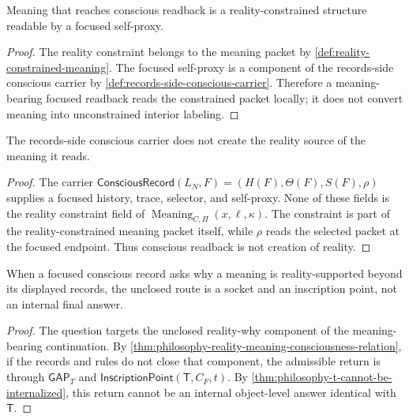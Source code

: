 \begin{corollary}
\label{cor:philosophy-meaning-readable-reality-constraint}
Meaning that reaches conscious readback is a reality-constrained
structure readable by a focused self-proxy.
\end{corollary}
\begin{proof}
The reality constraint belongs to the meaning packet by
\autoref{def:reality-constrained-meaning}. The focused self-proxy is a
component of the records-side conscious carrier by
\autoref{def:records-side-conscious-carrier}. Therefore a
meaning-bearing focused readback reads the constrained packet locally; it
does not convert meaning into unconstrained interior labeling.
\end{proof}

\begin{corollary}
\label{cor:philosophy-consciousness-does-not-create-reality}
The records-side conscious carrier does not create the reality source of
the meaning it reads.
\end{corollary}
\begin{proof}
The carrier
$\mathsf{ConsciousRecord}(L_N,F)=(H(F),\Theta(F),S(F),\rho)$ supplies a
focused history, trace, selector, and self-proxy. None of these fields
is the reality constraint field of
$\operatorname{Meaning}_{C,\Pi}(x,\ell,\kappa)$. The constraint is part
of the reality-constrained meaning packet itself, while $\rho$ reads the
selected packet at the focused endpoint. Thus conscious readback is not
creation of reality.
\end{proof}

\begin{corollary}
\label{cor:philosophy-question-action-expose-socket}
When a focused conscious record asks why a meaning is reality-supported
beyond its displayed records, the unclosed route is a socket and an
inscription point, not an internal final answer.
\end{corollary}
\begin{proof}
The question targets the unclosed reality-why component of the
meaning-bearing continuation. By
\autoref{thm:philosophy-reality-meaning-consciousness-relation}, if the
records and rules do not close that component, the admissible return is
through $\mathsf{GAP}_{T}$ and
$\mathsf{InscriptionPoint}(\mathsf{T},C_F,t)$. By
\autoref{thm:philosophy-t-cannot-be-internalized}, this return cannot be
an internal object-level answer identical with $\mathsf{T}$.
\end{proof}

